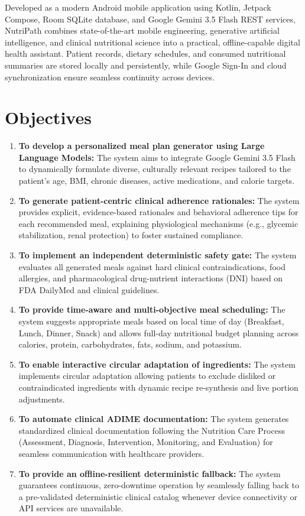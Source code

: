 \documentclass[a4paper,12pt]{report}
\begin{document}
Developed as a modern Android mobile application using Kotlin, Jetpack Compose, Room SQLite database, and Google Gemini 3.5 Flash REST services, NutriPath combines state-of-the-art mobile engineering, generative artificial intelligence, and clinical nutritional science into a practical, offline-capable digital health assistant. Patient records, dietary schedules, and consumed nutritional summaries are stored locally and persistently, while Google Sign-In and cloud synchronization ensure seamless continuity across devices.

\section{Objectives}
\begin{enumerate}
\item \textbf{To develop a personalized meal plan generator using Large Language Models:}
The system aims to integrate Google Gemini 3.5 Flash to dynamically formulate diverse, culturally relevant recipes tailored to the patient's age, BMI, chronic diseases, active medications, and calorie targets.

\item \textbf{To generate patient-centric clinical adherence rationales:}
The system provides explicit, evidence-based rationales and behavioral adherence tips for each recommended meal, explaining physiological mechanisms (e.g., glycemic stabilization, renal protection) to foster sustained compliance.

\item \textbf{To implement an independent deterministic safety gate:}
The system evaluates all generated meals against hard clinical contraindications, food allergies, and pharmacological drug-nutrient interactions (DNI) based on FDA DailyMed and clinical guidelines.

\item \textbf{To provide time-aware and multi-objective meal scheduling:}
The system suggests appropriate meals based on local time of day (Breakfast, Lunch, Dinner, Snack) and allows full-day nutritional budget planning across calories, protein, carbohydrates, fats, sodium, and potassium.

\item \textbf{To enable interactive circular adaptation of ingredients:}
The system implements circular adaptation allowing patients to exclude disliked or contraindicated ingredients with dynamic recipe re-synthesis and live portion adjustments.

\item \textbf{To automate clinical ADIME documentation:}
The system generates standardized clinical documentation following the Nutrition Care Process (Assessment, Diagnosis, Intervention, Monitoring, and Evaluation) for seamless communication with healthcare providers.

\item \textbf{To provide an offline-resilient deterministic fallback:}
The system guarantees continuous, zero-downtime operation by seamlessly falling back to a pre-validated deterministic clinical catalog whenever device connectivity or API services are unavailable.
\end{enumerate}
\end{document}

